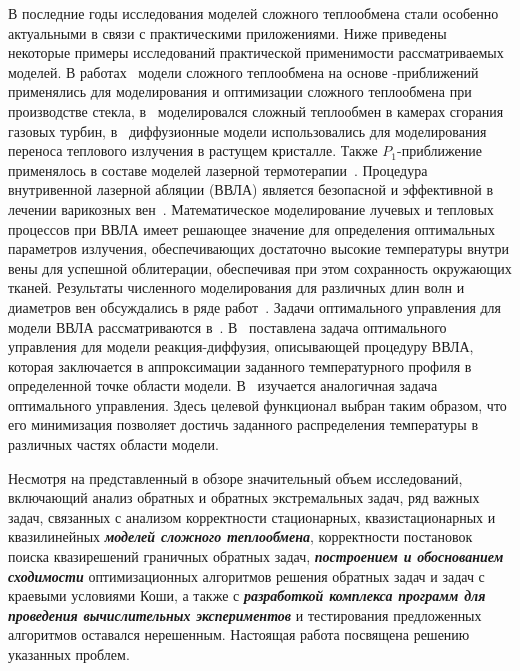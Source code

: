     В последние годы исследования моделей сложного теплообмена стали
    особенно актуальными в связи с практическими приложениями.
    Ниже приведены некоторые примеры исследований практической применимости
    рассматриваемых моделей.
    В работах~\cite{clever2012optimal, clever2014model,
        frank2010optimal, klar2005, lang2005adaptive, farina2011mathematical,
        Thommes2002, Pinnau2007b, Pinnau2004, Seaid2007, Larsen2002}
    модели сложного теплообмена на основе -приближений
    применялись для моделирования и оптимизации сложного теплообмена при
    производстве стекла, в~\cite{frank2004comparison, seaid2004efficient, Seaid2005}
    моделировался сложный теплообмен в
    камерах сгорания газовых турбин, в~\cite{Backofen2004} диффузионные модели
    использовались для моделирования переноса теплового излучения в
    растущем кристалле.
    Также $P_1$-приближение применялось в составе моделей
    лазерной термотерапии~\cite{Dombrovskii2015, Tse2012, Hubner2017}.
    Процедура внутривенной лазерной
    абляции (ВВЛА) является безопасной и эффективной в лечении варикозных
    вен~\cite{Endovenous_vandenBos2009}.
    Математическое моделирование лучевых и тепловых процессов
    при ВВЛА имеет решающее значение для определения оптимальных
    параметров излучения, обеспечивающих достаточно высокие температуры
    внутри вены для успешной облитерации, обеспечивая при этом сохранность
    окружающих тканей.
    Результаты численного моделирования для различных
    длин волн и диаметров вен обсуждались в ряде
    работ~\cite{van2014optical, Some_Poluektova2014, Endovenous_Malskat2014, Mathematical_Mordon2006}.
    Задачи оптимального управления для модели ВВЛА рассматриваются
    в~\cite{Optimal_Kovtanyuk2020, Inverse_Kovtanyuk2021}.
    В~\cite{Optimal_Kovtanyuk2020} поставлена задача оптимального
    управления для модели реакция-диффузия,
    описывающей процедуру ВВЛА, которая заключается в
    аппроксимации заданного температурного профиля в определенной точке
    области модели.
    В~\cite{Inverse_Kovtanyuk2021} изучается аналогичная задача оптимального управления.
    Здесь целевой функционал выбран таким образом, что его
    минимизация позволяет достичь заданного распределения температуры в
    различных частях области модели.


    Несмотря на представленный в обзоре значительный объем исследований,
    включающий анализ обратных и обратных экстремальных задач, ряд важных
    задач, связанных с анализом корректности стационарных,
    квазистационарных и квазилинейных \textit{\textbf{моделей сложного теплообмена}},
    корректности постановок поиска квазирешений граничных обратных задач,
    \textit{\textbf{построением и обоснованием сходимости}} оптимизационных алгоритмов
    решения обратных задач и задач с краевыми условиями Коши, а также с
    \textit{\textbf{разработкой комплекса программ для проведения вычислительных экспериментов}}
    и тестирования предложенных алгоритмов оставался нерешенным.
    Настоящая работа посвящена решению указанных проблем.


